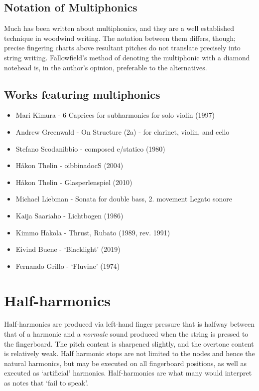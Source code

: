 \subsection{Notation of Multiphonics} \label{sec:notation-multiphonics}
Much has been written about multiphonics, and they are a well established technique in woodwind writing.
The notation between them differs, though; precise fingering charts above resultant pitches do not translate precisely into string writing.
Fallowfield's method of denoting the multiphonic with a diamond notehead is, in the author's opinion, preferable to the alternatives.


\subsection{Works featuring multiphonics} \label{sec:multiphonicsLiterature}

\begin{itemize}
    \item Mari Kimura - 6 Caprices for subharmonics for solo violin (1997) 
    \item Andrew Greenwald - On Structure (2a) - for clarinet, violin, and cello
    \item Stefano Scodanibbio - composed e/statico (1980)
    \item Håkon Thelin - oibbinadocS (2004)
    \item Håkon Thelin - Glasperlenspiel (2010)
    \item Michael Liebman - Sonata for double bass, 2. movement Legato sonore
    \item Kaija Saariaho - Lichtbogen (1986)
    \item Kimmo Hakola - Thrust, Rubato (1989, rev. 1991) 
    \item Eivind Buene - `Blacklight' (2019)
    \item Fernando Grillo - `Fluvine' (1974)
\end{itemize}

\section{Half-harmonics} \label{sec:half-harmonics}
Half-harmonics are produced via left-hand finger pressure that is halfway between that of a harmonic and a \emph{normale} sound produced when the string is pressed to the fingerboard.
The pitch content is sharpened slightly, and the overtone content is relatively weak.\autocite[113]{welbanksFoundationsModernCello}
Half harmonic stops are not limited to the nodes and hence the natural harmonics, but may be executed on all fingerboard positions, as well as executed as `artificial' harmonics.\autocite[127]{dimpkerExtendedNotationDepiction2012} 
Half-harmonics are what many would interpret as notes that `fail to speak'.

